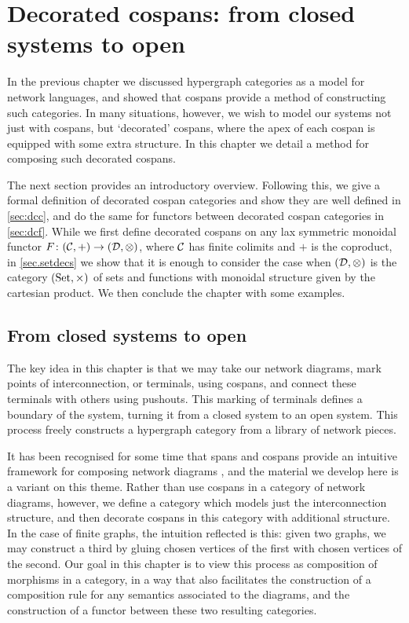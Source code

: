 \chapter{Decorated cospans: from closed systems to open} \label{ch.deccospans}

In the previous chapter we discussed hypergraph categories as a model for
network languages, and showed that cospans provide a method of constructing such
categories. In many situations, however, we wish to model our systems not just
with cospans, but `decorated' cospans, where the apex of each cospan is equipped
with some extra structure. In this chapter we detail a method for composing such
decorated cospans. 

The next section provides an introductory overview. Following this, we give a
formal definition of decorated cospan categories and show they are well defined
in \textsection\ref{sec:dcc}, and do the same for functors between decorated
cospan categories in \textsection\ref{sec:dcf}. While we first define decorated
cospans on any lax symmetric monoidal functor $F{\colon} (\mathcal C,+) \to
(\mathcal D,\otimes)$, where $\mathcal C$ has finite colimits and $+$ is the
coproduct, in \textsection\ref{sec.setdecs} we show that it is enough to
consider the case when $(\mathcal D, \otimes)$ is the category $(\mathrm{Set},\times)$ of
sets and functions with monoidal structure given by the cartesian product. We
then conclude the chapter with some examples.

\section{From closed systems to open} \label{sec.closedtoopen}

The key idea in this chapter is that we may take our network diagrams, mark
points of interconnection, or terminals, using cospans, and connect these
terminals with others using pushouts. This marking of terminals defines a
boundary of the system, turning it from a closed system to an open system.
This process freely constructs a hypergraph category from a library of network
pieces.

It has been recognised for some time that spans and cospans provide an intuitive
framework for composing network diagrams \cite{KSW}, and the material we develop
here is a variant on this theme. Rather than use cospans in a category of
network diagrams, however, we define a category which models just the
interconnection structure, and then decorate cospans in this category with
additional structure. In the case of finite graphs, the intuition reflected is
this: given two graphs, we may construct a third by gluing chosen vertices of
the first with chosen vertices of the second. Our goal in this chapter is to
view this process as composition of morphisms in a category, in a way that also
facilitates the construction of a composition rule for any semantics associated
to the diagrams, and the construction of a functor between these two resulting
categories.

